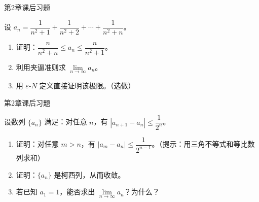 \documentclass[aspectratio=169,10pt,fontset=fandol]{ctexbeamer}
\begin{document}
\begin{frame}[t,fragile]{第2章课后习题}
\normalsize
{\normalsize
设 \(a_n = \dfrac{1}{n^2 + 1} + \dfrac{1}{n^2 + 2} + \cdots + \dfrac{1}{n^2 + n}\)。

\begin{enumerate}

\item 证明：\(\dfrac{n}{n^2 + n} \leq a_n \leq \dfrac{n}{n^2 + 1}\)。

\item 利用夹逼准则求 \(\lim\limits_{n\to\infty} a_n\)。

\item 用 \(\varepsilon\)-\(N\) 定义直接证明该极限。（选做）

\end{enumerate}


}
\end{frame}
\begin{frame}[t,fragile]{第2章课后习题}
\normalsize
{\normalsize


设数列 \(\{a_n\}\) 满足：对任意 \(n\)，有 \(|a_{n+1} - a_n| \leq \dfrac{1}{2^n}\)。

\begin{enumerate}

\item 证明：对任意 \(m > n\)，有 \(|a_m - a_n| \leq \dfrac{1}{2^{n-1}}\)。（提示：用三角不等式和等比数列求和）

\item 证明：\(\{a_n\}\) 是柯西列，从而收敛。

\item 若已知 \(a_1 = 1\)，能否求出 \(\lim\limits_{n\to\infty} a_n\)？为什么？

\end{enumerate}


}
\end{frame}
\end{document}
